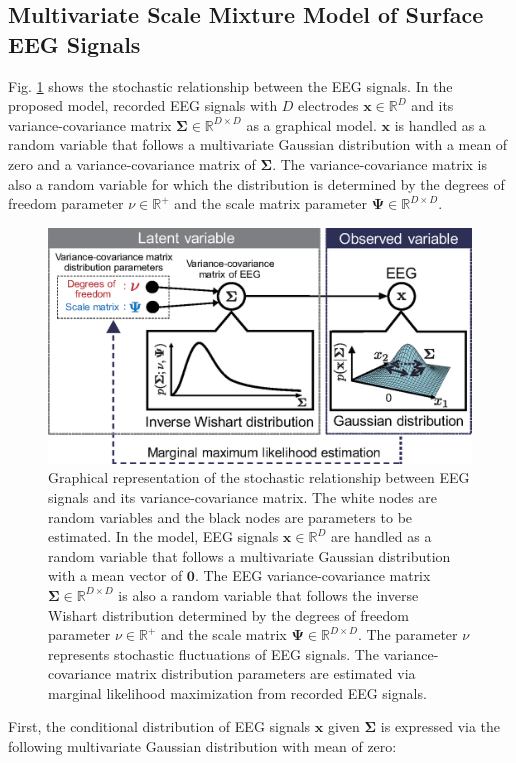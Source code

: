 \documentclass[journal]{IEEEtran}
\begin{document}
\subsection{Multivariate Scale Mixture Model of Surface EEG Signals}
Fig. \ref{fig:model} shows the stochastic relationship between the EEG signals.
In the proposed model, recorded EEG signals with $D$ electrodes $\mathbf{x} \in \mathbb{R}^{D}$ and its variance-covariance matrix $\mathbf{\Sigma} \in \mathbb{R}^{D \times D}$ as a graphical model.
$\mathbf{x}$ is handled as a random variable that follows a multivariate Gaussian distribution with a mean of zero and a variance-covariance matrix of $\mathbf{\Sigma}$.
The variance-covariance matrix  is also a random variable for which the distribution is determined by the degrees of freedom parameter $\nu \in \mathbb{R}^+$ and the scale matrix parameter $\mathbf{\Psi} \in \mathbb{R}^{D \times D}$.


\begin{figure}[!t]
\centering
\includegraphics[width=1.0\hsize]{figure/fig1_ver2.eps}
\caption{Graphical representation of the stochastic relationship between EEG signals  and its variance-covariance matrix.
The white nodes are random variables and the black nodes are parameters to be estimated.
In the model, EEG signals $\mathbf{x} \in \mathbb{R}^{D}$ are handled as a random variable that follows a multivariate Gaussian distribution with a mean vector of $\mathbf{0}$.
The EEG variance-covariance matrix $\mathbf{\Sigma} \in \mathbb{R}^{D \times D}$ is also a random variable that follows the inverse Wishart distribution determined by the degrees of freedom parameter $\nu \in \mathbb{R}^+$ and the scale matrix $\mathbf{\Psi} \in \mathbb{R}^{D \times D}$. The parameter $\nu$ represents stochastic fluctuations of EEG signals.
The variance-covariance matrix distribution parameters are estimated via marginal likelihood maximization from recorded EEG signals.}
\label{fig:model}
\end{figure}
First, the conditional distribution of  EEG signals $\mathbf{x}$ given $\mathbf{\Sigma}$ is expressed via the following multivariate Gaussian distribution with mean of zero:
\end{document}
